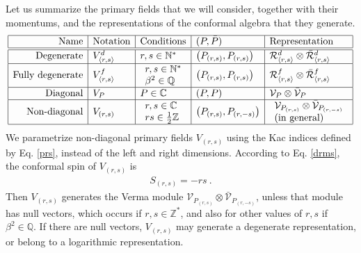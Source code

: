 \documentclass[12pt, a4paper]{article}
\begin{document}
Let us summarize the primary fields that we will consider, together with their momentums, and the representations of the conformal algebra that they generate. 
\begin{align}
 \begin{array}{|r|l|l|l|l|}
  \hline 
  \text{Name} & \text{Notation} & \text{Conditions} & (P, \bar P) & \text{Representation}
  \\
  \hline \hline 
  \text{Degenerate} &  V^d_{\langle r,s\rangle} &  r,s\in\mathbb{N}^* & \left(P_{(r,s)},P_{(r,s)}\right)  & \mathcal{R}^d_{\langle r,s\rangle}\otimes \bar{\mathcal{R}}^d_{\langle r,s\rangle} 
  \\
  \hline 
  \text{Fully degenerate} & V^f_{\langle r,s\rangle} & \begin{array}{l} r,s\in\mathbb{N}^* \\ \beta^2\in\mathbb{Q} \end{array} & \left(P_{(r,s)},P_{(r,s)}\right)  & \mathcal{R}^f_{\langle r,s\rangle}\otimes \bar{\mathcal{R}}^f_{\langle r,s\rangle} 
  \\
  \hline 
  \text{Diagonal} & V_P & P\in\mathbb{C} & \left(P,P\right) & \mathcal{V}_P\otimes \bar{\mathcal{V}}_P 
  \\
  \hline 
  \text{Non-diagonal} & V_{(r,s)} & 
  \begin{array}{l} r,s\in\mathbb{C} \\ 
  rs\in \tfrac12\mathbb{Z} \end{array} & \left(P_{(r,s)},P_{(r,-s)}\right) & 
  \begin{array}{l} \mathcal{V}_{P_{(r,s)}} \otimes \bar{\mathcal{V}}_{P_{(r,-s)}} \\ \text{(in general)} \end{array}
  \\
  \hline 
 \end{array}
 \label{fields}
\end{align}
We parametrize non-diagonal primary fields $V_{(r,s)}$ using the Kac indices defined by Eq. \eqref{prs}, instead of the left and right dimensions. 
According to Eq. \eqref{drms}, the conformal spin of $V_{(r,s)}$ is 
\begin{align}
 \boxed{S_{(r,s)}= -rs} \ . 
 \label{srs}
\end{align}
Then $V_{(r,s)}$ generates the Verma module $\mathcal{V}_{P_{(r,s)}} \otimes \bar{\mathcal{V}}_{P_{(r,-s)}}$, unless that module has null vectors, which occurs if $r,s\in\mathbb{Z}^*$, and also for other values of $r,s$ if $\beta^2\in\mathbb{Q}$. If there are null vectors, $V_{(r,s)}$ may generate a degenerate representation, or belong to a logarithmic representation. 
\end{document}
